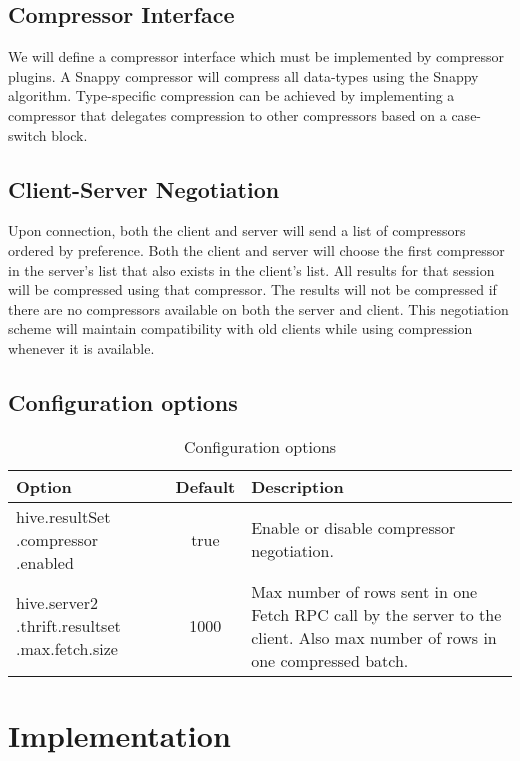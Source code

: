 \documentclass[11pt,a4paper]{article}
\begin{document}
	\subsection{Compressor Interface}
		We will define a compressor interface which must be implemented by compressor plugins.
		A Snappy compressor will compress all data-types using the Snappy algorithm.
		Type-specific compression can be achieved by implementing a compressor that delegates compression to other compressors based on a case-switch block.
		
	\subsection{Client-Server Negotiation}
		Upon connection, both the client and server will send a list of compressors ordered by preference.
		Both the client and server will choose the first compressor in the server's list that also exists in the client's list.
		All results for that session will be compressed using that compressor.
		The results will not be compressed if there are no compressors available on both the server and client.
		This negotiation scheme will maintain compatibility with old clients while using compression whenever it is available.
		
	\subsection{Configuration options}
		\begin{table}[H]
			\begin{tabular}{| p{3cm} | c | p{6.5cm} |} \hline
				\textbf{Option} & \textbf{Default} & \textbf{Description} \\ \hline
					hive.resultSet\linebreak
					.compressor\linebreak
					.enabled
				 & true & Enable or disable compressor negotiation. \\ \hline
					 hive.server2\linebreak
					 .thrift.resultset\linebreak
					 .max.fetch.size
				 & 1000 & Max number of rows sent in one Fetch RPC call by the server to the client. Also max number of rows in one compressed batch.
				 \\ \hline
			\end{tabular}
			\caption{Configuration options}
		\end{table}

\section{Implementation}
	
\end{document}
